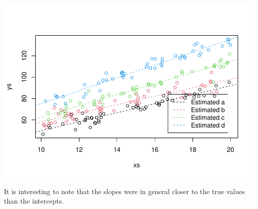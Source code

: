 \documentclass[
]{book}
\begin{document}
\includegraphics{ECOMODbook_files/figure-latex/a11.15-1.pdf}

It is interesting to note that the slopes were in general closer to the true values than the intercepts.
\end{document}

